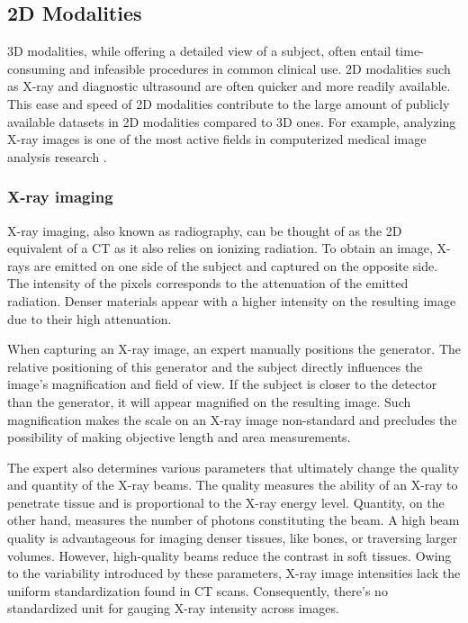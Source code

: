 \subsection{2D Modalities}

3D modalities, while offering a detailed view of a subject, often entail time-consuming and infeasible procedures in common clinical use. 2D modalities such as X-ray and diagnostic ultrasound are often quicker and more readily available. This ease and speed of 2D modalities contribute to the large amount of publicly available datasets in 2D modalities compared to 3D ones. For example, analyzing X-ray images is one of the most active fields in computerized medical image analysis research \cite{nguyen2020vindrcxr, irvinCheXpertLargeChest2019}.

\subsubsection{X-ray imaging}

X-ray imaging, also known as radiography, can be thought of as the 2D equivalent of a CT as it also relies on ionizing radiation. To obtain an image, X-rays are emitted on one side of the subject and captured on the opposite side. The intensity of the pixels corresponds to the attenuation of the emitted radiation. Denser materials appear with a higher intensity on the resulting image due to their high attenuation.

When capturing an X-ray image, an expert manually positions the generator. The relative positioning of this generator and the subject directly influences the image's magnification and field of view. If the subject is closer to the detector than the generator, it will appear magnified on the resulting image. Such magnification makes the scale on an X-ray image non-standard and precludes the possibility of making objective length and area measurements.

The expert also determines various parameters that ultimately change the quality and quantity of the X-ray beams. The quality measures the ability of an X-ray to penetrate tissue and is proportional to the X-ray energy level. Quantity, on the other hand, measures the number of photons constituting the beam. A high beam quality is advantageous for imaging denser tissues, like bones, or traversing larger volumes. However, high-quality beams reduce the contrast in soft tissues. Owing to the variability introduced by these parameters, X-ray image intensities lack the uniform standardization found in CT scans. Consequently, there's no standardized unit for gauging X-ray intensity across images.

